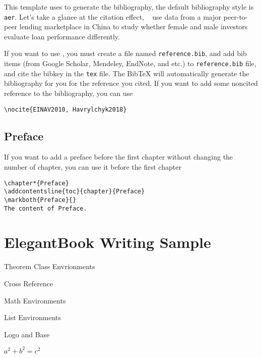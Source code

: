 \documentclass[noanswer,fancy,blue,11pt,hide]{elegantbook}
\begin{document}
This template uses  to generate the bibliography, the default bibliography style is \lstinline{aer}. Let's take a glance at the citation effect, ~\cite{en1} use data from a major peer-to-peer lending marketplace in China to study whether female and male investors evaluate loan performance differently. 

If you want to use , you must create a file named \lstinline{reference.bib}, and add bib items (from Google Scholar, Mendeley, EndNote, and etc.) to \lstinline{reference.bib} file, and cite the bibkey in the \lstinline{tex} file. The Bib\TeX{} will automatically generate the bibliography for you for the reference you cited. If you want to add some noncited reference to the bibliography, you can use 
\begin{lstlisting}
\nocite{EINAV2010, Havrylchyk2018} 
\end{lstlisting}

\section{Preface}

If you want to add a preface before the first chapter without changing the number of chapter, you can use it before the first chapter 
\begin{lstlisting}
\chapter*{Preface}
\addcontentsline{toc}{chapter}{Preface} 
\markboth{Preface}{} 
The content of Preface.
\end{lstlisting}

\chapter{ElegantBook Writing Sample}

\begin{introduction}
\item Theorem Class Envrionments
\item Cross Reference
\item Math Environments
\item List Environments
\item Logo and Base 
\item $a^2+b^2=c^2$
\end{introduction}


\lipsum[1]
\end{document}
